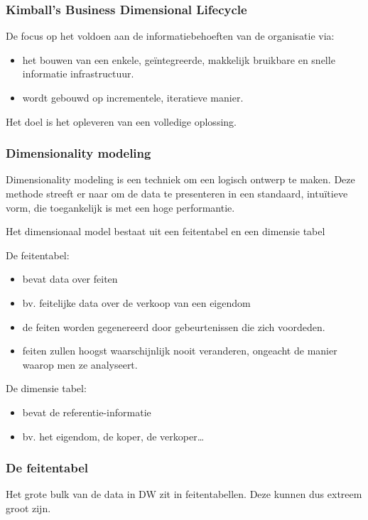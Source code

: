 \documentclass[a4paper,12pt]{article}
\begin{document}
\subsubsection{Kimball's Business Dimensional Lifecycle}
De focus op het voldoen aan de informatiebehoeften van de organisatie via:
\begin{itemize}
\item het bouwen van een enkele, geïntegreerde, makkelijk bruikbare en snelle informatie infrastructuur.
\item wordt gebouwd op incrementele, iteratieve manier.
\end{itemize}

Het doel is het opleveren van een volledige oplossing.

\subsubsection{Dimensionality modeling}
Dimensionality modeling is een techniek om een logisch ontwerp te maken.
Deze methode streeft er naar om de data te presenteren in een standaard, intuïtieve vorm, die toegankelijk is met een hoge performantie.

Het dimensionaal model bestaat uit een feitentabel en een dimensie tabel

De feitentabel:
\begin{itemize}
\item bevat data over feiten
\item bv. feitelijke data over de verkoop van een eigendom
\item de feiten worden gegenereerd door gebeurtenissen die zich voordeden.
\item feiten zullen hoogst waarschijnlijk nooit veranderen, ongeacht de manier waarop men ze analyseert.
\end{itemize}

De dimensie tabel:
\begin{itemize}
\item bevat de referentie-informatie
\item bv. het eigendom, de koper, de verkoper\ldots
\end{itemize}

\subsubsection{De feitentabel}
Het grote bulk van de data in DW zit in feitentabellen.
Deze kunnen dus extreem groot zijn.
\end{document}
